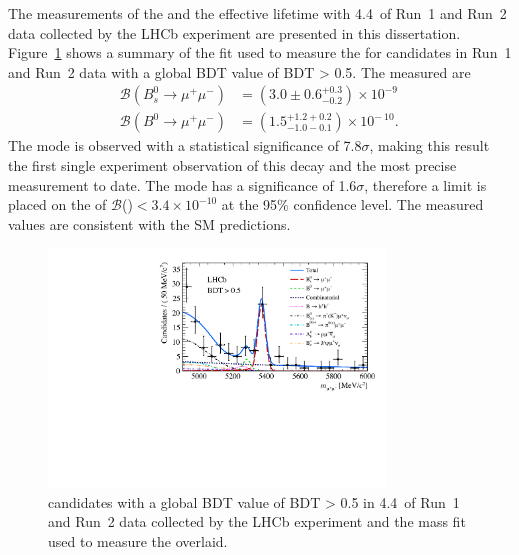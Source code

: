 The measurements of the \bmumu \BFs and the \bsmumu effective lifetime with 4.4~\fb of Run~1 and Run~2 data collected by the LHCb experiment are presented in this dissertation. Figure~\ref{fig:BDT} shows a summary of the fit used to measure the \bmumu \BFs for candidates in Run~1 and Run~2 data with a global BDT value of BDT > 0.5. The measured \BFs are
\begin{equation}
\begin{split}
  \mathcal{B}(B^{0}_{s} \to \mu^{+} \mu^{-}) &= (3.0 \pm 0.6^{+0.3}_{-0.2}) \times 10^{-9\
} \\
  \mathcal{B}(B^{0} \to \mu^{+} \mu^{-}) &= (1.5^{+1.2 +0.2}_{-1.0 -0.1})    \times 10^{-\
10}.
\end{split}
\label{eq:BFresults2}
\end{equation}
The \bs mode is observed with a statistical significance of 7.8$\sigma$, making this result the first single experiment observation of this decay and the most precise measurement to date. The \bd mode has a significance of 1.6$\sigma$, therefore a limit is placed on the \BF of $\mathcal{B}$(\bdmumu)$ < 3.4 \times 10^{-10}$ at the 95$\%$ confidence level. The measured values are consistent with the SM predictions. %
\begin{figure}[tbp]
    \centering
        \includegraphics[width=0.8\textwidth]{./Figs/Summary/BDT_plot.pdf}
    \caption{\bmumu candidates with a global BDT value of BDT > 0.5 in 4.4~\fb of Run~1 and Run~2 data collected by the LHCb experiment and the mass fit used to measure the \bmumu \BFs overlaid.}
    \label{fig:BDT}
\end{figure}

